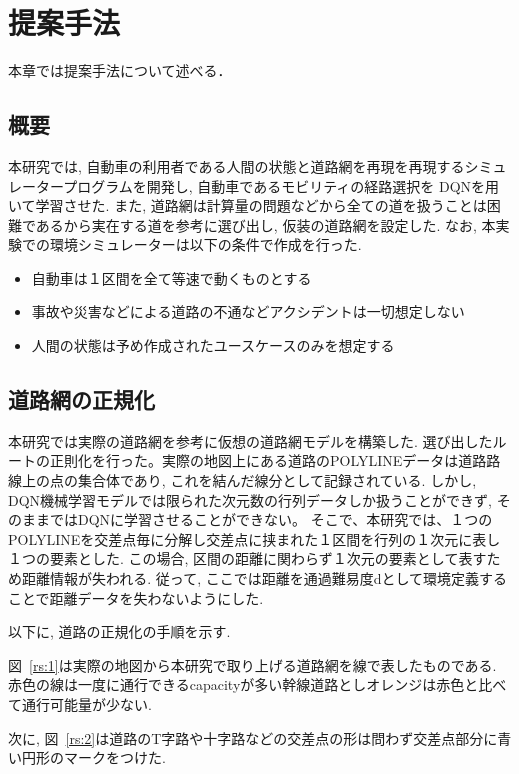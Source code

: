 \chapter{提案手法}
\label{proposed}

本章では提案手法について述べる．

\section{概要}

本研究では, 自動車の利用者である人間の状態と道路網を再現を再現するシミュレータープログラムを開発し, 自動車であるモビリティの経路選択を
DQNを用いて学習させた.
また, 道路網は計算量の問題などから全ての道を扱うことは困難であるから実在する道を参考に選び出し, 仮装の道路網を設定した.
なお, 本実験での環境シミュレーターは以下の条件で作成を行った.

\begin{itemize}
    \item 自動車は１区間を全て等速で動くものとする
    \item 事故や災害などによる道路の不通などアクシデントは一切想定しない
    \item 人間の状態は予め作成されたユースケースのみを想定する
\end{itemize}


\section{道路網の正規化}

本研究では実際の道路網を参考に仮想の道路網モデルを構築した.
選び出したルートの正則化を行った。実際の地図上にある道路のPOLYLINEデータは道路路線上の点の集合体であり, これを結んだ線分として記録されている. しかし, DQN機械学習モデルでは限られた次元数の行列データしか扱うことができず, そのままではDQNに学習させることができない。
そこで、本研究では、１つのPOLYLINEを交差点毎に分解し交差点に挟まれた１区間を行列の１次元に表し１つの要素とした.
この場合, 区間の距離に関わらず１次元の要素として表すため距離情報が失われる. 従って, ここでは距離を通過難易度dとして環境定義することで距離データを失わないようにした.

以下に, 道路の正規化の手順を示す.

図~\ref{rs:1}は実際の地図から本研究で取り上げる道路網を線で表したものである. 赤色の線は一度に通行できるcapacityが多い幹線道路としオレンジは赤色と比べて通行可能量が少ない.

次に, 図~\ref{rs:2}は道路のT字路や十字路などの交差点の形は問わず交差点部分に青い円形のマークをつけた. 

